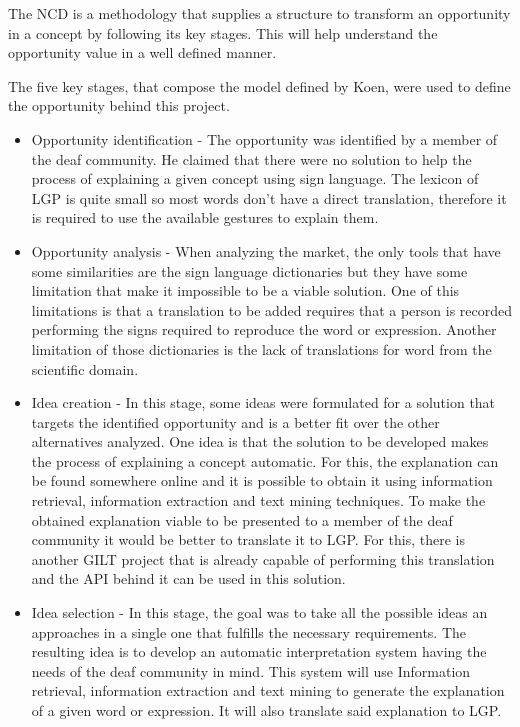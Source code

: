 The \gls{NCD}\cite{koen2001providing} is a methodology that supplies a structure to transform an opportunity in a concept by following its key stages.
This will help understand the opportunity value in a well defined manner.

The five key stages, that compose the model defined by Koen\cite{koen2001providing}, were used to define the opportunity behind this project.

\begin{itemize}
    \item Opportunity identification - The opportunity was identified by a member of the deaf community.
    He claimed that there were no solution to help the process of explaining a given concept using sign language.
    The lexicon of \gls{LGP} is quite small so most words don't have a direct translation, therefore it is required to use the available gestures to explain them.

    \item Opportunity analysis - When analyzing the market, the only tools that have some similarities are the sign language dictionaries but they have some limitation that make it impossible to be a viable solution.
    One of this limitations is that a translation to be added requires that a person is recorded performing the signs required to reproduce the word or expression.
    Another limitation of those dictionaries is the lack of translations for word from the scientific domain.

    \item Idea creation - In this stage, some ideas were formulated for a solution that targets the identified opportunity and is a better fit over the other alternatives analyzed.
    One idea is that the solution to be developed makes the process of explaining a concept automatic.
    For this, the explanation can be found somewhere online and it is possible to obtain it using information retrieval, information extraction and text mining techniques.
    To make the obtained explanation viable to be presented to a member of the deaf community it would be better to translate it to \gls{LGP}.
    For this, there is another GILT project that is already capable of performing this translation and the \gls{API} behind it can be used in this solution.

    \item Idea selection - In this stage, the goal was to take all the possible ideas an approaches in a single one that fulfills the necessary requirements.
    The resulting idea is to develop an automatic interpretation system having the needs of the deaf community in mind.
    This system will use Information retrieval, information extraction and text mining to generate the explanation of a given word or expression.
    It will also translate said explanation to \gls{LGP}.


\end{itemize}
